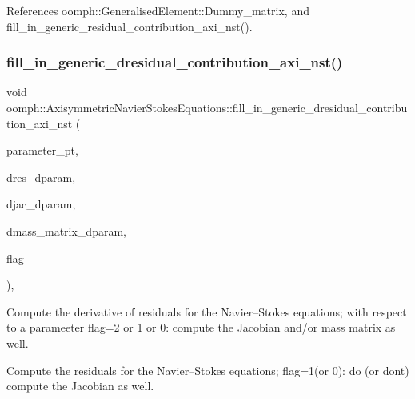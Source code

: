 References oomph\+::\+Generalised\+Element\+::\+Dummy\+\_\+matrix, and fill\+\_\+in\+\_\+generic\+\_\+residual\+\_\+contribution\+\_\+axi\+\_\+nst().

\mbox{\label{classoomph_1_1AxisymmetricNavierStokesEquations_a19a4b0c9d98bd79212fe8b507d44f7ab}} 
\subsubsection{\texorpdfstring{fill\+\_\+in\+\_\+generic\+\_\+dresidual\+\_\+contribution\+\_\+axi\+\_\+nst()}{fill\_in\_generic\_dresidual\_contribution\_axi\_nst()}}
{\footnotesize\ttfamily void oomph\+::\+Axisymmetric\+Navier\+Stokes\+Equations\+::fill\+\_\+in\+\_\+generic\+\_\+dresidual\+\_\+contribution\+\_\+axi\+\_\+nst (\begin{DoxyParamCaption}\item[{double $\ast$const \&}]{parameter\+\_\+pt,  }\item[{\hyperlink{classoomph_1_1Vector}{Vector}$<$ double $>$ \&}]{dres\+\_\+dparam,  }\item[{\hyperlink{classoomph_1_1DenseMatrix}{Dense\+Matrix}$<$ double $>$ \&}]{djac\+\_\+dparam,  }\item[{\hyperlink{classoomph_1_1DenseMatrix}{Dense\+Matrix}$<$ double $>$ \&}]{dmass\+\_\+matrix\+\_\+dparam,  }\item[{unsigned}]{flag }\end{DoxyParamCaption})\hspace{0.3cm}{\ttfamily [protected]}, {\ttfamily [virtual]}}



Compute the derivative of residuals for the Navier--Stokes equations; with respect to a parameeter flag=2 or 1 or 0\+: compute the Jacobian and/or mass matrix as well. 

Compute the residuals for the Navier--Stokes equations; flag=1(or 0)\+: do (or don\textquotesingle{}t) compute the Jacobian as well. 

